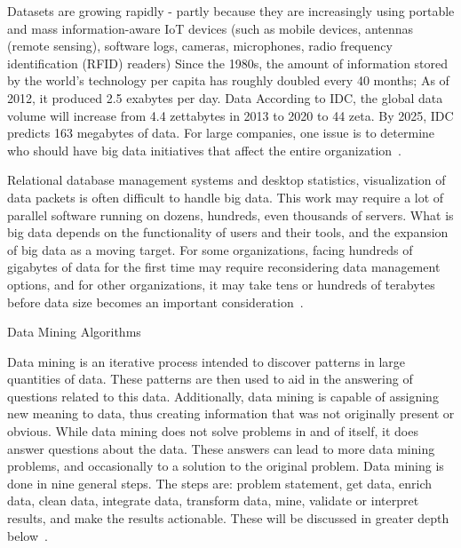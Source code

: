 Datasets are growing rapidly - partly because they are increasingly 
using portable and mass information-aware IoT devices (such as mobile
 devices, antennas (remote sensing), software logs, cameras, 
microphones, radio frequency identification (RFID) readers) Since 
the 1980s, the amount of information stored by the world's technology
 per capita has roughly doubled every 40 months; As of 2012, it 
produced 2.5 exabytes per day. Data According to IDC, the global 
data volume will increase from 4.4 zettabytes in 2013 to 2020 to 44 
zeta. By 2025, IDC predicts 163 megabytes of data. For large 
companies, one issue is to determine who should have big data 
initiatives that affect the entire organization~\cite{editor03}.

Relational database management systems and desktop statistics, 
visualization of data packets is often difficult to handle big data. 
This work may require a lot of parallel software running on dozens, 
hundreds, even thousands of servers. What is big data depends on the 
functionality of users and their tools, and the expansion of big data
 as a moving target. For some organizations, facing hundreds of 
gigabytes of data for the first time may require reconsidering data 
management options, and for other organizations, it may take tens or 
hundreds of terabytes before data size becomes an important 
consideration~\cite{editor03}.

Data Mining Algorithms

Data mining is an iterative process intended to discover patterns
in large quantities of data. These patterns are then used to aid 
in the answering of questions related to this data. Additionally,
data mining is capable of assigning new meaning to data, thus 
creating information that was not originally present or obvious. 
While data mining does not solve problems in and of itself, it 
does answer questions about the data. These answers can lead to 
more data mining problems, and occasionally to a solution to the 
original problem. Data mining is done in nine general steps. The 
steps are: problem statement, get data, enrich data, clean data, 
integrate data, transform data, mine, validate or interpret 
results, and make the results actionable. These will be discussed 
in greater depth below~\cite{editor06}.


